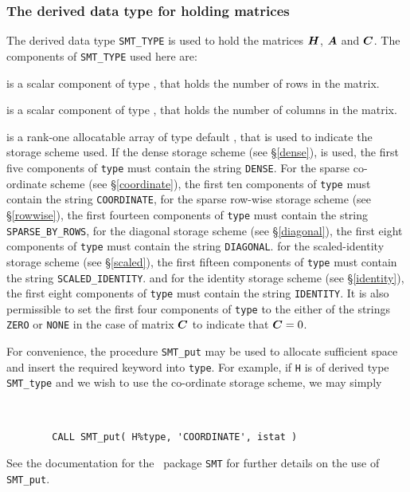 \documentclass{galahad}
\begin{document}

\subsubsection{The derived data type for holding matrices}\label{typesmt}
The derived data type {\tt SMT\_TYPE} is used to hold the matrices ${\bm{H}}$,
${\bm{A}}$ and ${\bm{C}}$. The components of {\tt SMT\_TYPE} used here are:

\begin{description}

 is a scalar component of type \integer,
that holds the number of rows in the matrix.

 is a scalar component of type \integer,
that holds the number of columns in the matrix.

 is a rank-one allocatable array of type default \character, that
is used to indicate the storage scheme used. If the dense storage scheme
(see \S\ref{dense}), is used,
the first five components of {\tt type} must contain the
string {\tt DENSE}.
For the sparse co-ordinate scheme (see \S\ref{coordinate}),
the first ten components of {\tt type} must contain the
string {\tt COORDINATE},
for the sparse row-wise storage scheme (see \S\ref{rowwise}),
the first fourteen components of {\tt type} must contain the
string {\tt SPARSE\_BY\_ROWS},
for the diagonal storage scheme (see \S\ref{diagonal}),
the first eight components of {\tt type} must contain the
string {\tt DIAGONAL}.
for the scaled-identity storage scheme (see \S\ref{scaled}),
the first fifteen components of {\tt type} must contain the
string {\tt SCALED\_IDENTITY}.
and for the identity storage scheme (see \S\ref{identity}),
the first eight components of {\tt type} must contain the
string {\tt IDENTITY}.
It is also permissible to set
the first four components of {\tt type} to the either of the strings
{\tt ZERO} or {\tt NONE}
in the case of matrix ${\bm{C}}$ to indicate that ${\bm{C}} = 0$.

For convenience, the procedure {\tt SMT\_put}
may be used to allocate sufficient space and insert the required keyword
into {\tt type}.
For example, if {\tt H} is of derived type {\tt SMT\_type}
and we wish to use the co-ordinate storage scheme, we may simply
{\tt
\begin{verbatim}
        CALL SMT_put( H%type, 'COORDINATE', istat )
\end{verbatim}
}
\noindent
See the documentation for the \galahad\ package {\tt SMT}
for further details on the use of {\tt SMT\_put}.


\end{description}
\end{document}
